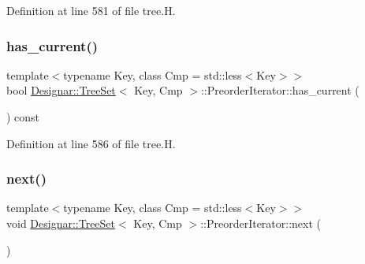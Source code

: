 Definition at line 581 of file tree.\+H.

\mbox{\label{class_designar_1_1_tree_set_1_1_preorder_iterator_a24d3c99c070468afe487e41fb17fec2d}} 
\subsubsection{\texorpdfstring{has\+\_\+current()}{has\_current()}}
{\footnotesize\ttfamily template$<$typename Key, class Cmp = std\+::less$<$\+Key$>$$>$ \\
bool \hyperlink{class_designar_1_1_tree_set}{Designar\+::\+Tree\+Set}$<$ Key, Cmp $>$\+::Preorder\+Iterator\+::has\+\_\+current (\begin{DoxyParamCaption}{ }\end{DoxyParamCaption}) const\hspace{0.3cm}{\ttfamily [inline]}}



Definition at line 586 of file tree.\+H.

\mbox{\label{class_designar_1_1_tree_set_1_1_preorder_iterator_a8d9d382d80687846dc21f9b5445d59c7}} 
\subsubsection{\texorpdfstring{next()}{next()}}
{\footnotesize\ttfamily template$<$typename Key, class Cmp = std\+::less$<$\+Key$>$$>$ \\
void \hyperlink{class_designar_1_1_tree_set}{Designar\+::\+Tree\+Set}$<$ Key, Cmp $>$\+::Preorder\+Iterator\+::next (\begin{DoxyParamCaption}{ }\end{DoxyParamCaption})\hspace{0.3cm}{\ttfamily [inline]}}




